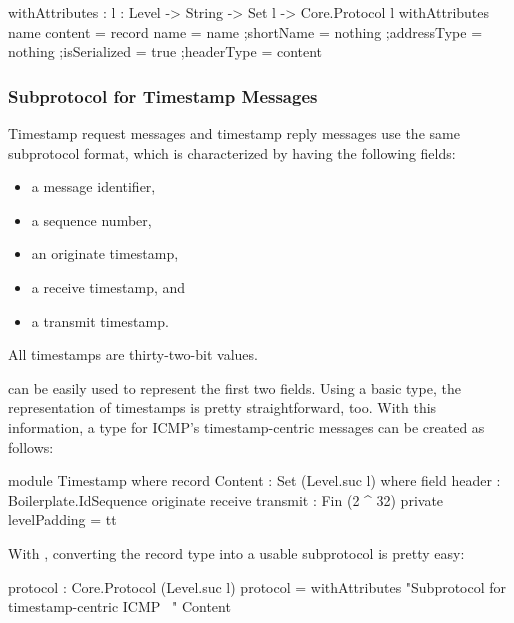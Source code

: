 \documentclass{report}
\begin{document}
\begin{itemize}
\begin{code}
    withAttributes : {l : Level} -> String -> Set l -> Core.Protocol l
    withAttributes name content = record
      {name = name
      ;shortName = nothing
      ;addressType = nothing
      ;isSerialized = true
      ;headerType = content
      }
\end{code}

\subsubsection{Subprotocol for Timestamp Messages}
Timestamp request messages and timestamp reply messages use the same subprotocol format, which is characterized by having the following fields:

\begin{itemize}
\item a message identifier,
\item a sequence number,
\item an originate timestamp,
\item a receive timestamp, and
\item a transmit timestamp.
\end{itemize}

All timestamps are thirty-two-bit values.

 can be easily used to represent the first two fields.  Using a basic  type, the representation of timestamps is pretty straightforward, too.  With this information, a type  for ICMP's timestamp-centric messages can be created as follows:

\begin{code}
    module Timestamp where
      record Content : Set (Level.suc l) where
        field
          header : Boilerplate.IdSequence
          originate
           receive
           transmit : Fin (2 ^ 32)
        private
          levelPadding = tt
\end{code}

With , converting the record type into a usable subprotocol is pretty easy:

\begin{code}
      protocol : Core.Protocol (Level.suc l)
      protocol = withAttributes "Subprotocol for timestamp-centric ICMP \
                                \messages"
                                Content
\end{code}


\end{itemize}
\end{document}
